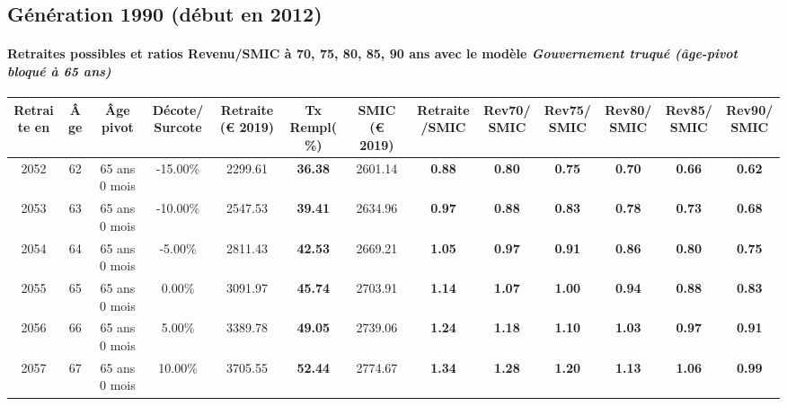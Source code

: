 \newpage 
 
\subsection{Génération 1990 (début en 2012)} 

\paragraph{Retraites possibles et ratios Revenu/SMIC à 70, 75, 80, 85, 90 ans avec le modèle \emph{Gouvernement truqué (âge-pivot bloqué à 65 ans)}}  
 
{ \scriptsize \begin{center} 
\begin{tabular}[htb]{|c|c||c|c||c|c||c||c|c|c|c|c|c|} 
\hline 
 Retraite en &  Âge &  Âge pivot &  Décote/Surcote &  Retraite (\euro{} 2019) &  Tx Rempl(\%) &  SMIC (\euro{} 2019) &  Retraite/SMIC &  Rev70/SMIC &  Rev75/SMIC &  Rev80/SMIC &  Rev85/SMIC &  Rev90/SMIC \\ 
\hline \hline 
 2052 &  62 &  65 ans 0 mois &  -15.00\% &  2299.61 &  {\bf 36.38} &  2601.14 &  {\bf {\color{red} 0.88}} &  {\bf {\color{red} 0.80}} &  {\bf {\color{red} 0.75}} &  {\bf {\color{red} 0.70}} &  {\bf {\color{red} 0.66}} &  {\bf {\color{red} 0.62}} \\ 
\hline 
 2053 &  63 &  65 ans 0 mois &  -10.00\% &  2547.53 &  {\bf 39.41} &  2634.96 &  {\bf {\color{red} 0.97}} &  {\bf {\color{red} 0.88}} &  {\bf {\color{red} 0.83}} &  {\bf {\color{red} 0.78}} &  {\bf {\color{red} 0.73}} &  {\bf {\color{red} 0.68}} \\ 
\hline 
 2054 &  64 &  65 ans 0 mois &  -5.00\% &  2811.43 &  {\bf 42.53} &  2669.21 &  {\bf 1.05} &  {\bf {\color{red} 0.97}} &  {\bf {\color{red} 0.91}} &  {\bf {\color{red} 0.86}} &  {\bf {\color{red} 0.80}} &  {\bf {\color{red} 0.75}} \\ 
\hline 
 2055 &  65 &  65 ans 0 mois &  0.00\% &  3091.97 &  {\bf 45.74} &  2703.91 &  {\bf 1.14} &  {\bf 1.07} &  {\bf 1.00} &  {\bf {\color{red} 0.94}} &  {\bf {\color{red} 0.88}} &  {\bf {\color{red} 0.83}} \\ 
\hline 
 2056 &  66 &  65 ans 0 mois &  5.00\% &  3389.78 &  {\bf 49.05} &  2739.06 &  {\bf 1.24} &  {\bf 1.18} &  {\bf 1.10} &  {\bf 1.03} &  {\bf {\color{red} 0.97}} &  {\bf {\color{red} 0.91}} \\ 
\hline 
 2057 &  67 &  65 ans 0 mois &  10.00\% &  3705.55 &  {\bf 52.44} &  2774.67 &  {\bf 1.34} &  {\bf 1.28} &  {\bf 1.20} &  {\bf 1.13} &  {\bf 1.06} &  {\bf {\color{red} 0.99}} \\ 
\hline 
\hline 
\end{tabular} 
\end{center} } 
